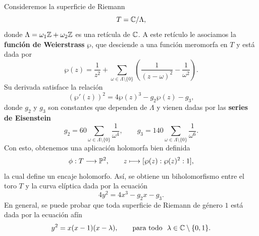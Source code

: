 	\begin{example}\parencite{curvaselipticas}
		Consideremos la superficie de Riemann
		\[
		T=\mathbb{C}/\Lambda,
		\]
		donde $\Lambda=\omega_1\mathbb{Z}+\omega_2\mathbb{Z}$ es una retícula de $\mathbb{C}$. A este retículo le asociamos la \textbf{función de Weierstrass} $\wp$, que desciende a una función meromorfa en $T$ y está dada por
		\[
		\wp(z)=\frac{1}{z^2}+\sum_{\omega\in\Lambda\setminus\{0\}}
		\left(\frac{1}{(z-\omega)^2}-\frac{1}{\omega^2}\right).
		\]
		Su derivada satisface la relación
		\[
		(\wp'(z))^2=4\wp(z)^3-g_2\wp(z)-g_3,
		\]
		donde $g_2$ y $g_3$ son constantes que dependen de $\Lambda$ y vienen dadas por las \textbf{series de Eisenstein}
		\[
		g_2=60\sum_{\omega\in\Lambda\setminus\{0\}}\frac{1}{\omega^4},
		\qquad
		g_3=140\sum_{\omega\in\Lambda\setminus\{0\}}\frac{1}{\omega^6}.
		\]
		Con esto, obtenemos una aplicación holomorfa bien definida
		\[
		\phi:T\longrightarrow \mathbb{P}^2,\qquad
		z\longmapsto [\wp(z):\wp(z)^2:1],
		\]
		la cual define un encaje holomorfo. Así, se obtiene un biholomorfismo entre el toro $T$ y la curva elíptica dada por la ecuación
		\[
		4y^2=4x^3-g_2x-g_3.
		\]
		En general, se puede probar que toda superficie de Riemann de género $1$ está dada por la ecuación afín
		\begin{equation*}
			y^2=x(x-1)(x-\lambda),\qquad \text{para todo }\ \lambda\in\cc\setminus\{0,1\}. 
		\end{equation*}
	\end{example}

